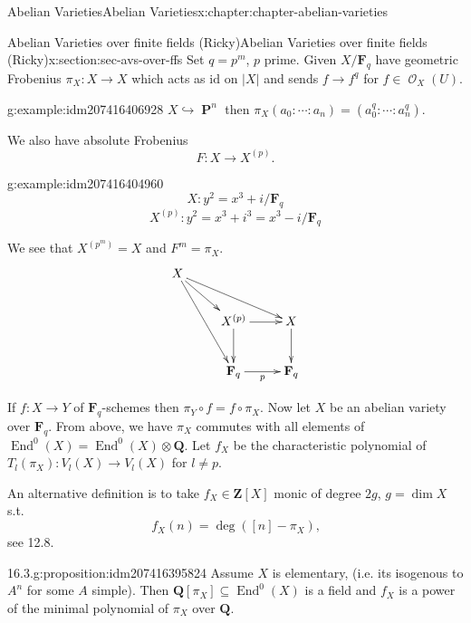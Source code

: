 \documentclass[oneside,10pt,]{book}
\numberwithin{equation}{section}
\newcommand{\sheaf}[1]{\operatorname{\mathcal{#1}}}
\newcommand{\lb}{[}
\newcommand{\rb}{]}
\newcommand{\ZZ}{\mathbf{Z}}
\newcommand{\QQ}{\mathbf{Q}}
\newcommand{\FF}{\mathbf{F}}
\newcommand{\id}{\mathrm{id}}
\DeclareMathOperator{\End}{End}
\DeclareMathOperator{\PP}{\mathbf{P}}
\begin{document}
\begin{chapterptx}{Abelian Varieties}{}{Abelian Varieties}{}{}{x:chapter:chapter-abelian-varieties}
%
%
\typeout{************************************************}
\typeout{************************************************}
%
\begin{sectionptx}{Abelian Varieties over finite fields (Ricky)}{}{Abelian Varieties over finite fields (Ricky)}{}{}{x:section:sec-avs-over-ffs}
Set \(q = p^m\), \(p\) prime. Given \(X/\FF_q\) have  geometric Frobenius \(\pi_X\colon X \to X\) which acts as \(\id\) on \(|X|\) and sends \(f\to f^q\) for \(f\in \sheaf O_X(U)\).%
\begin{example}{}{g:example:idm207416406928}%
\(X \hookrightarrow \PP^n\) then \(\pi_X(a_0:\cdots :a_n) = (a_0^q : \cdots :a_n^q)\).%
\end{example}
We also have absolute Frobenius%
\begin{equation*}
F\colon X\to X^{(p)}\text{.}
\end{equation*}
%
\begin{example}{}{g:example:idm207416404960}%
%
\begin{equation*}
X \colon y^2 = x^3 + i / \FF_q
\end{equation*}
%
\begin{equation*}
X^{(p)} \colon y^2 = x^3 + i^3 = x^3 - i / \FF_q
\end{equation*}
%
\end{example}
We see that \(X^{(p^m)} = X\) and \(F^m = \pi_X\).%
\begin{equation*}
\xymatrix{
X \ar[drr] \ar[dr]\ar[ddr] & &\\
& X^{(p)} \ar[d]\ar[r] & X\ar[d]\\
& \FF_q \ar[r]_p &\FF_q
}
\end{equation*}
%
\par
If \(f\colon X \to Y\) of \(\FF_q\)-schemes then \(\pi_Y \circ f = f\circ \pi_X\). Now let \(X\) be an abelian variety over \(\FF_q\). From above, we have \(\pi_X\) commutes with all elements of \(\End^0(X) = \End^0(X)\otimes \QQ\). Let \(f_X\) be the characteristic polynomial of \(T_l(\pi_X) \colon V_l(X) \to V_l(X)\) for \(l \ne p\).%
\par
An alternative definition is to take \(f_X\in \ZZ\lb X\rb\) monic of degree \(2g \), \(g = \dim X\) s.t.%
\begin{equation*}
f_X(n) = \deg([n] -\pi_X)\text{,}
\end{equation*}
see 12.8.%
\begin{proposition}{16.3.}{}{g:proposition:idm207416395824}%
Assume \(X\) is elementary, (i.e. its isogenous to \(A^n\) for some \(A\) simple). Then  \(\QQ\lb \pi_X\rb\subseteq \End^0(X)\) is a field and \(f_X\) is a power of the minimal polynomial of \(\pi_X\) over \(\QQ\).%

\end{proposition}
\end{sectionptx}
\end{chapterptx}
\end{document}
